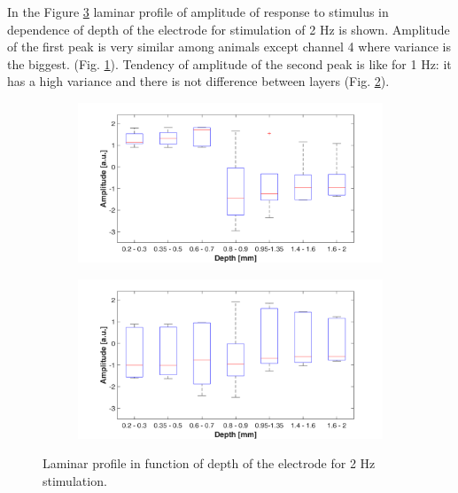 \documentclass{pracalicmgr}
\begin{document}
    In the Figure \ref{rys:profil_2Hz_amp} laminar profile of amplitude of response to stimulus in dependence of depth of the electrode for stimulation of 2 Hz is shown. Amplitude of the first peak is very similar among animals except channel 4 where variance is the biggest. (Fig. \ref{rys:profil_2Hz_amp1}). Tendency of amplitude of the second peak is like for 1 Hz: it has a high variance and there is not difference between layers (Fig. \ref{rys:profil_2Hz_amp2}).
  
 	\begin{figure}[H]
 	\begin{subfigure}{.5\textwidth}
 		\centering
 		\includegraphics[width=1.\linewidth]{profile_2Hz_amp.png}
 		\caption{}
 		\label{rys:profil_2Hz_amp1}
 	\end{subfigure}%
 	\begin{subfigure}{.5\textwidth}
 		\centering
 		\includegraphics[width=1.\linewidth]{profile_2Hz_amp2.png}
 		\caption{}
 		\label{rys:profil_2Hz_amp2}
 	\end{subfigure}
 	
 	\caption{Laminar profile in function of depth of the electrode for 2 Hz stimulation.}
 	\label{rys:profil_2Hz_amp}
 \end{figure}
\end{document}
